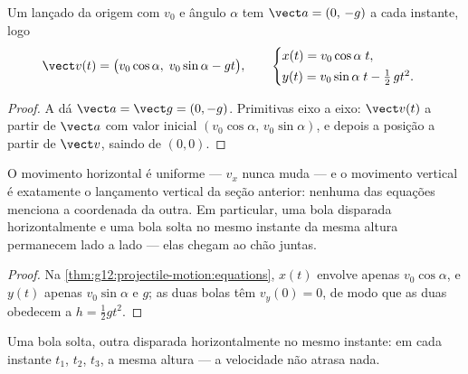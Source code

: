 \begin{theorem}\label{thm:g12:projectile-motion:equations}
Um  lançado da origem com  $v_0$ e ângulo $\alpha$ tem
$\vect a = (0,\,-g)$ a cada instante, logo
\[
\vect v(t) = \bigl(v_0\cos\alpha,\; v_0\sin\alpha - g t\bigr),
\qquad
\begin{cases}
x(t) = v_0\cos\alpha\; t,\\[2pt]
y(t) = v_0\sin\alpha\; t - \tfrac12\, g t^2 .
\end{cases}
\]
\end{theorem}

\begin{proof}
A  dá $\vect a = \vect g = (0,-g)$. Primitivas eixo a eixo:
$\vect v(t)$ a partir de $\vect a$ com valor inicial
$(v_0\cos\alpha,\, v_0\sin\alpha)$, e depois a posição a partir de $\vect v$, saindo
de $(0,0)$.
\end{proof}

\begin{proposition}\label{prop:g12:projectile-motion:independence}
O movimento horizontal é uniforme --- $v_x$ nunca muda --- e o movimento vertical é
exatamente o lançamento vertical da seção anterior: nenhuma das equações menciona a
coordenada da outra. Em particular, uma bola disparada horizontalmente e uma bola
solta no mesmo instante da mesma altura permanecem lado a lado --- elas chegam ao chão
juntas.
\end{proposition}

\begin{proof}
Na \cref{thm:g12:projectile-motion:equations}, $x(t)$ envolve apenas $v_0\cos\alpha$,
e $y(t)$ apenas $v_0\sin\alpha$ e $g$; as duas bolas têm $v_y(0) = 0$, de modo que as
duas obedecem a $h = \tfrac12 gt^2$.
\end{proof}

\begin{omfigure}

{\small Uma bola solta, outra disparada horizontalmente no mesmo instante: em cada
instante $t_1$, $t_2$, $t_3$, a mesma altura --- a velocidade não atrasa nada.}
\end{omfigure}

